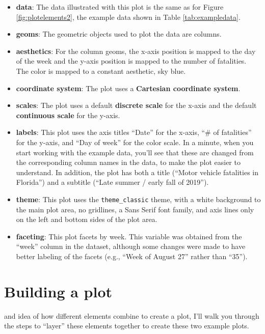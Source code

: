 \documentclass[]{tufte-book}
\providecommand{\tightlist}{%
  \setlength{\itemsep}{0pt}\setlength{\parskip}{0pt}}
\begin{document}
\begin{itemize}
\tightlist
\item
  \textbf{data}: The data illustrated with this plot is the same as for Figure
  \ref{fig:plotelements2}, the example data
  shown in Table \ref{tab:exampledata}.
\item
  \textbf{geoms}: The geometric objects used to plot the data are columns.
\item
  \textbf{aesthetics}: For the column geoms, the x-axis position is mapped to the day
  of the week and the y-axis position is mapped to the number of fatalities. The
  color is mapped to a constant aesthetic, sky blue.
\item
  \textbf{coordinate system}: The plot uses a \textbf{Cartesian coordinate system}.
\item
  \textbf{scales}: The plot uses a default \textbf{discrete scale} for the x-axis and the
  default \textbf{continuous scale} for the y-axis.
\item
  \textbf{labels}: This plot uses the axis titles ``Date'' for the x-axis, ``\# of fatalities''
  for the y-axis, and ``Day of week'' for the color scale. In a minute, when you start
  working with the example data, you'll see that these are changed from the corresponding
  column names in the data, to make the plot easier to understand. In addition,
  the plot has both a title (``Motor vehicle fatalities in Florida'') and a
  subtitle (``Late summer / early fall of 2019'').
\item
  \textbf{theme}: This plot uses the \texttt{theme\_classic} theme, with a white background
  to the main plot area, no gridlines, a Sans Serif font family,
  and axis lines only on the left and bottom sides of the plot area.
\item
  \textbf{faceting}: This plot facets by week. This variable was obtained from the ``week''
  column in the dataset, although some changes were made to have better labeling of
  the facets (e.g., ``Week of August 27'' rather than ``35'').
\end{itemize}

\hypertarget{building-a-plot}{%
\section{Building a plot}\label{building-a-plot}}

 and idea of how different elements combine to
create a plot, I'll walk you through the steps to ``layer'' these elements together
to create these two example plots.
\end{document}
